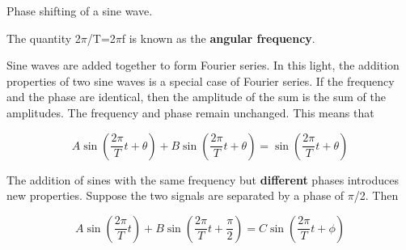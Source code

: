 \begin{marginfigure}

\caption{Phase shifting of a sine wave.}
\label{fig:fs1}
\end{marginfigure}

The quantity 2$\pi$/T=2$\pi$f is known as the {\bf angular frequency}.

Sine waves are added together to form Fourier series. In this light, the addition properties of two sine waves is a special case of Fourier series. If the frequency and the phase are identical, then the amplitude of the sum is the sum of the amplitudes. The frequency and phase remain unchanged. This means that

\begin{equation}
A\sin\left( \dfrac{2\pi}{T}t+\theta \right)+B\sin\left(\dfrac{2\pi}{T}t+\theta\right)=\sin\left(\dfrac{2\pi}{T}t+\theta\right)
\label{equ:fs2}
\end{equation}

The addition of sines with the same frequency but {\bf different} phases introduces new properties. Suppose the two signals are separated by a phase of $\pi$/2. Then

\begin{equation}
A\sin\left(\dfrac{2\pi}{T}t\right)+B\sin\left(\dfrac{2\pi}{T}t+\dfrac{\pi}{2}\right)=C\sin\left(\dfrac{2\pi}{T}t+\phi\right)
\label{equ:fs3}
\end{equation}

